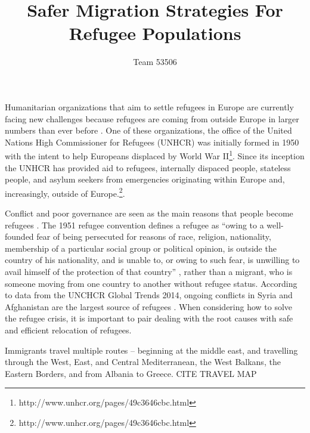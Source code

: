 \documentclass{article}
\title{Safer Migration Strategies For Refugee Populations}
\author{Team 53506}
\begin{document}
\maketitle
\tableofcontents

\maketitle

\newpage


Humanitarian organizations that aim to settle refugees in Europe are currently facing new challenges because refugees are coming from outside Europe in larger numbers than ever before \cite{simpson}. One of these organizations, the office of the United Nations High Commissioner for Refugees (UNHCR) was initially formed in 1950 with the intent to help Europeans displaced by World War II\footnote{http://www.unhcr.org/pages/49c3646cbc.html}. Since its inception the UNHCR has provided aid to refugees, internally dispaced people, stateless people, and asylum seekers from emergencies originating within Europe and, increasingly, outside of Europe.\footnote{http://www.unhcr.org/pages/49c3646cbc.html}.

Conflict and poor governance are seen as the main reasons that people become refugees \cite{simpson}. The 1951 refugee convention defines a refugee as ``owing to a well-founded fear of being persecuted for reasons of race, religion, nationality, membership of a particular social group or political opinion, is outside the country of his nationality, and is unable to, or owing to such fear, is unwilling to avail himself of the protection of that country'' \cite{1951convention}, rather than a migrant, who is someone moving from one country to another without refugee status. According to data from the UNCHCR Global Trends 2014, ongoing conflicts in Syria and Afghanistan are the largest source of refugees \cite{refugeefactsheet}. When considering how to solve the refugee crisis, it is important to pair dealing with the root causes with safe and efficient relocation of refugees.

Immigrants travel multiple routes -- beginning at the middle east, and travelling through the West, East, and Central Mediterranean, the West Balkans, the Eastern Borders, and from Albania to Greece.
CITE TRAVEL MAP
\end{document}
